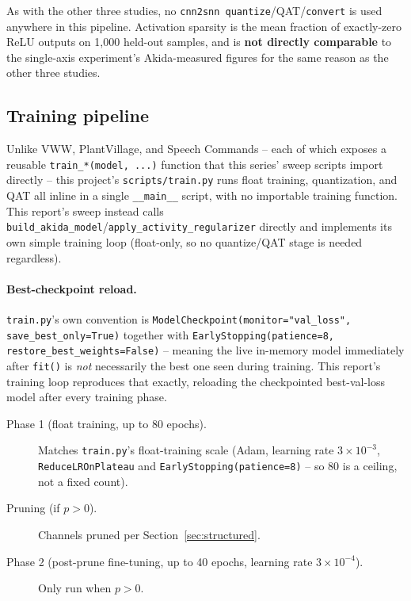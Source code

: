 \documentclass[11pt]{article}
\newcommand{\code}[1]{\texttt{#1}}
\begin{document}
As with the other three studies, no \code{cnn2snn quantize}/QAT/\code{convert} is used anywhere in this pipeline. Activation sparsity is the mean fraction of exactly-zero ReLU outputs on 1{,}000 held-out samples, and is \textbf{not directly comparable} to the single-axis experiment's Akida-measured figures for the same reason as the other three studies.

\subsection{Training pipeline}

Unlike VWW, PlantVillage, and Speech Commands -- each of which exposes a reusable \code{train\_*(model, ...)} function that this series' sweep scripts import directly -- this project's \code{scripts/train.py} runs float training, quantization, and QAT all inline in a single \code{\_\_main\_\_} script, with no importable training function. This report's sweep instead calls \code{build\_akida\_model}/\code{apply\_activity\_regularizer} directly and implements its own simple training loop (float-only, so no quantize/QAT stage is needed regardless).

\paragraph{Best-checkpoint reload.} \code{train.py}'s own convention is \code{ModelCheckpoint(monitor="val\_loss", save\_best\_only=True)} together with \code{EarlyStopping(patience=8, restore\_best\_weights=False)} -- meaning the live in-memory model immediately after \code{fit()} is \emph{not} necessarily the best one seen during training. This report's training loop reproduces that exactly, reloading the checkpointed best-val-loss model after every training phase.

\begin{description}
    \item[Phase 1 (float training, up to 80 epochs).] Matches \code{train.py}'s float-training scale (Adam, learning rate $3\times10^{-3}$, \code{ReduceLROnPlateau} and \code{EarlyStopping(patience=8)} -- so 80 is a ceiling, not a fixed count).
    \item[Pruning (if $p>0$).] Channels pruned per Section~\ref{sec:structured}.
    \item[Phase 2 (post-prune fine-tuning, up to 40 epochs, learning rate $3\times10^{-4}$).] Only run when $p>0$.
\end{description}
\end{document}
